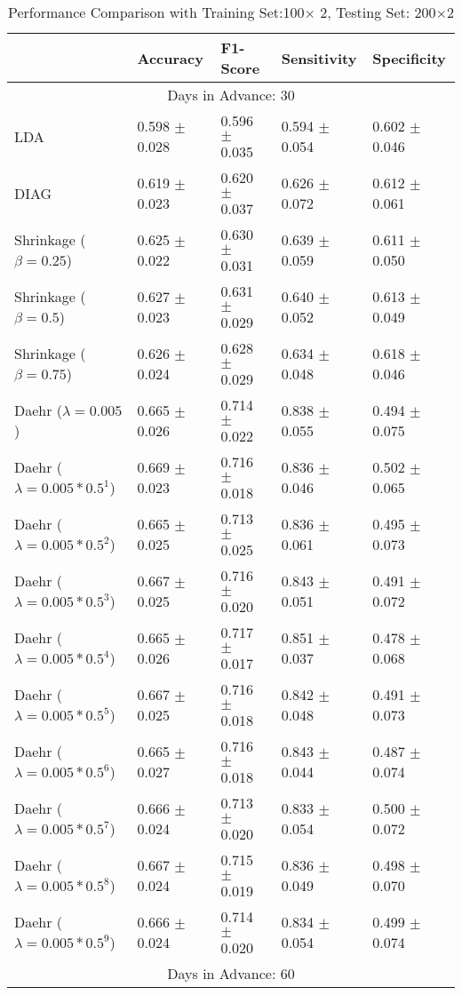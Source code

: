 \begin{table}
\caption{Performance Comparison with Training Set:100$\times$ 2, Testing Set: 200$\times$2}
\footnotesize
\centering
\begin{tabular}{*{5}{l}}
\toprule
 & Accuracy & F1-Score & Sensitivity & Specificity\\
\hline\multicolumn{5}{c}{  Days in Advance: 30}\\\hline
LDA&0.598 $\pm$ 0.028&0.596 $\pm$ 0.035&0.594 $\pm$ 0.054&0.602 $\pm$ 0.046\\
DIAG&0.619 $\pm$ 0.023&0.620 $\pm$ 0.037&0.626 $\pm$ 0.072&0.612 $\pm$ 0.061\\
Shrinkage ($\beta=0.25$)&0.625 $\pm$ 0.022&0.630 $\pm$ 0.031&0.639 $\pm$ 0.059&0.611 $\pm$ 0.050\\
Shrinkage ($\beta=0.5$)&0.627 $\pm$ 0.023&0.631 $\pm$ 0.029&0.640 $\pm$ 0.052&0.613 $\pm$ 0.049\\
Shrinkage ($\beta=0.75$)&0.626 $\pm$ 0.024&0.628 $\pm$ 0.029&0.634 $\pm$ 0.048&0.618 $\pm$ 0.046\\
Daehr ($\lambda=0.005$)&0.665 $\pm$ 0.026&0.714 $\pm$ 0.022&0.838 $\pm$ 0.055&0.494 $\pm$ 0.075\\
Daehr ($\lambda=0.005*0.5^1$)&0.669 $\pm$ 0.023&0.716 $\pm$ 0.018&0.836 $\pm$ 0.046&0.502 $\pm$ 0.065\\
Daehr ($\lambda=0.005*0.5^2$)&0.665 $\pm$ 0.025&0.713 $\pm$ 0.025&0.836 $\pm$ 0.061&0.495 $\pm$ 0.073\\
Daehr ($\lambda=0.005*0.5^3$)&0.667 $\pm$ 0.025&0.716 $\pm$ 0.020&0.843 $\pm$ 0.051&0.491 $\pm$ 0.072\\
Daehr ($\lambda=0.005*0.5^4$)&0.665 $\pm$ 0.026&0.717 $\pm$ 0.017&0.851 $\pm$ 0.037&0.478 $\pm$ 0.068\\
Daehr ($\lambda=0.005*0.5^5$)&0.667 $\pm$ 0.025&0.716 $\pm$ 0.018&0.842 $\pm$ 0.048&0.491 $\pm$ 0.073\\
Daehr ($\lambda=0.005*0.5^6$)&0.665 $\pm$ 0.027&0.716 $\pm$ 0.018&0.843 $\pm$ 0.044&0.487 $\pm$ 0.074\\
Daehr ($\lambda=0.005*0.5^7$)&0.666 $\pm$ 0.024&0.713 $\pm$ 0.020&0.833 $\pm$ 0.054&0.500 $\pm$ 0.072\\
Daehr ($\lambda=0.005*0.5^8$)&0.667 $\pm$ 0.024&0.715 $\pm$ 0.019&0.836 $\pm$ 0.049&0.498 $\pm$ 0.070\\
Daehr ($\lambda=0.005*0.5^9$)&0.666 $\pm$ 0.024&0.714 $\pm$ 0.020&0.834 $\pm$ 0.054&0.499 $\pm$ 0.074\\
\hline\multicolumn{5}{c}{  Days in Advance: 60}\\\hline

\end{tabular}
\end{table}
